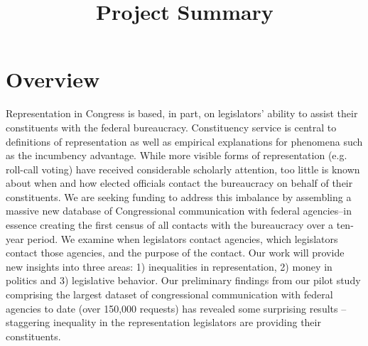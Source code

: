 \documentclass{article}
\title{Project Summary}
\date{}
\begin{document}
\maketitle




\doublespacing

\section*{Overview}

Representation in Congress is based, in part, on legislators' ability to assist their constituents with the federal bureaucracy. Constituency service is central to definitions of representation as well as empirical explanations for phenomena such as the incumbency advantage. While more visible forms of representation (e.g. roll-call voting) have received considerable scholarly attention, too little is known about when and how elected officials contact the bureaucracy on behalf of their constituents. We are seeking funding to address this imbalance by assembling a massive new database of Congressional communication with federal agencies--in essence creating the first census of all contacts with the bureaucracy over a ten-year period. We examine when legislators contact agencies, which legislators contact those agencies, and the purpose of the contact. Our work will provide new insights into three areas: 1) inequalities in representation, 2) money in politics and 3) legislative behavior. Our preliminary findings from our pilot study comprising the largest dataset of congressional communication with federal agencies to date (over 150,000 requests) has revealed some surprising results -- staggering inequality in the representation legislators are providing their constituents.   
\end{document}
